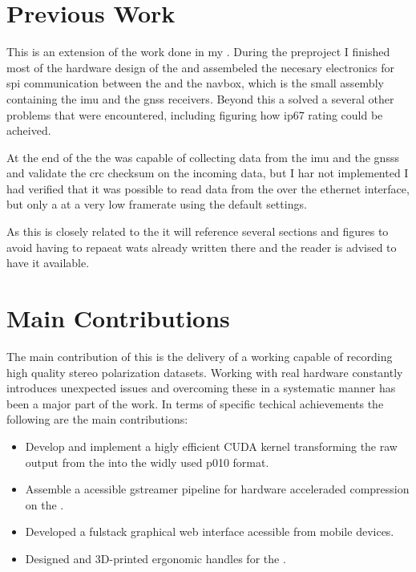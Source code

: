 \section{Previous Work}
This \master is an extension of the work done in my \preproject \cite{martensPortableSensorRig2022}.
During the preproject I finished most of the hardware design of the \sr
and assembeled the necesary electronics for \gls{spi} communication between the \jx and the \gls{navbox}, which is the small assembly containing the \gls{imu} and the \gls{gnss} receivers.
Beyond this a solved a several other problems that were encountered, including figuring how \gls{ip67} rating could be acheived.

At the end of the \preproject the \sr was capable of collecting data from the \gls{imu} and the \glspl{gnss} and validate the \gls{crc} checksum on the incoming data, but I har not implemented
I had verified that it was possible to read data from the \cams over the ethernet interface, but only a at a very low framerate using the default settings.

As this \master is closely related to the \preproject it will reference several sections and figures to avoid having to repaeat wats already written there and the reader is advised to have it available.

\section{Main Contributions}
The main contribution of this \master is the delivery of a working \sr capable of recording high quality stereo polarization datasets.
Working with real hardware constantly introduces unexpected issues and overcoming these in a systematic manner has been a major part of the work.
In terms of specific techical achievements the following are the main contributions:

\begin{itemize}
    \item Develop and implement a higly efficient CUDA kernel transforming the raw output from the \cams into the widly used \gls{p010} format.
    \item Assemble a \py acessible \gls{gstreamer} pipeline for hardware acceleraded compression on the \jx.
    \item Developed a fulstack graphical web interface acessible from mobile devices.
    \item Designed and 3D-printed ergonomic handles for the \sr.
\end{itemize}


